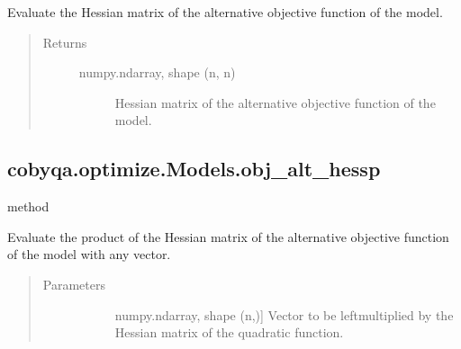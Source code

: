 \documentclass[letterpaper,10pt,english]{sphinxmanual}
\begin{document}
\begin{fulllineitems}
\begin{fulllineitems}
\label{\detokenize{refs/generated/cobyqa.optimize.Models.obj_alt_hess:cobyqa.optimize.Models.obj_alt_hess}}
\sphinxAtStartPar
Evaluate the Hessian matrix of the alternative objective function of the
model.
\begin{quote}\begin{description}
\item[{Returns}] \leavevmode\begin{description}
\item[{numpy.ndarray, shape (n, n)}] \leavevmode
\sphinxAtStartPar
Hessian matrix of the alternative objective function of the model.

\end{description}

\end{description}\end{quote}

\end{fulllineitems}



\subsection{cobyqa.optimize.Models.obj\_alt\_hessp}
\label{\detokenize{refs/generated/cobyqa.optimize.Models.obj_alt_hessp:cobyqa-optimize-models-obj-alt-hessp}}\label{\detokenize{refs/generated/cobyqa.optimize.Models.obj_alt_hessp::doc}}
\sphinxAtStartPar
method

\begin{fulllineitems}
\label{\detokenize{refs/generated/cobyqa.optimize.Models.obj_alt_hessp:cobyqa.optimize.Models.obj_alt_hessp}}
\sphinxAtStartPar
Evaluate the product of the Hessian matrix of the alternative objective
function of the model with any vector.
\begin{quote}\begin{description}
\item[{Parameters}] \leavevmode\begin{description}
\item[{}] \leavevmode{[}numpy.ndarray, shape (n,){]}
\sphinxAtStartPar
Vector to be left\sphinxhyphen{}multiplied by the Hessian matrix of the quadratic
function.


\end{description}
\end{description}
\end{quote}
\end{fulllineitems}
\end{fulllineitems}
\end{document}
